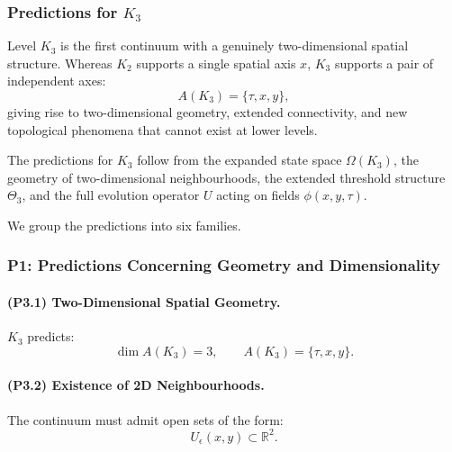 

\subsubsection{Predictions for \texorpdfstring{$K_3$}{K_3}}
\label{sec:predictions-k3}

Level $K_3$ is the first continuum with a genuinely two-dimensional spatial
structure. Whereas $K_2$ supports a single spatial axis $x$, $K_3$ supports a
pair of independent axes:
\[
A(K_3) = \{\tau, x, y\},
\]
giving rise to two-dimensional geometry, extended connectivity, and new
topological phenomena that cannot exist at lower levels.

The predictions for $K_3$ follow from the expanded state space
$\Omega(K_3)$, the geometry of two-dimensional neighbourhoods,
the extended threshold structure $\Theta_3$, and the full evolution
operator $U$ acting on fields $\phi(x,y,\tau)$.

We group the predictions into six families.

\subsubsection{P1: Predictions Concerning Geometry and Dimensionality}

\paragraph{(P3.1) Two-Dimensional Spatial Geometry.}
$K_3$ predicts:
\[
\dim A(K_3) = 3,
\qquad
A(K_3) = \{\tau, x, y\}.
\]

\paragraph{(P3.2) Existence of 2D Neighbourhoods.}
The continuum must admit open sets of the form:
\[
U_\epsilon(x,y) \subset \mathbb{R}^2.
\]

